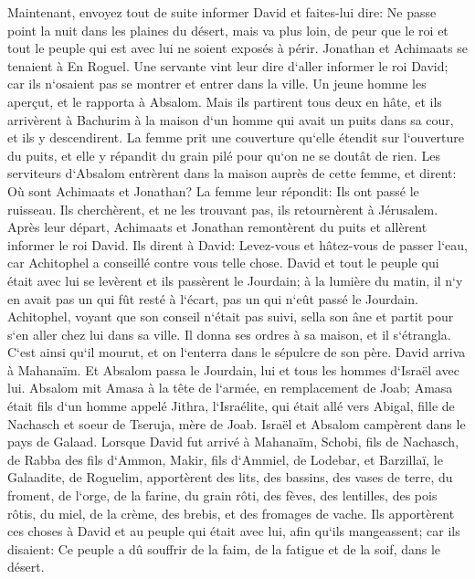 \verse Maintenant, envoyez tout de suite informer David et faites-lui dire: Ne passe point la nuit dans les plaines du désert, mais va plus loin, de peur que le roi et tout le peuple qui est avec lui ne soient exposés à périr. 
\verse Jonathan et Achimaats se tenaient à En Roguel. Une servante vint leur dire d`aller informer le roi David; car ils n`osaient pas se montrer et entrer dans la ville. 
\verse Un jeune homme les aperçut, et le rapporta à Absalom. Mais ils partirent tous deux en hâte, et ils arrivèrent à Bachurim à la maison d`un homme qui avait un puits dans sa cour, et ils y descendirent. 
\verse La femme prit une couverture qu`elle étendit sur l`ouverture du puits, et elle y répandit du grain pilé pour qu`on ne se doutât de rien. 
\verse Les serviteurs d`Absalom entrèrent dans la maison auprès de cette femme, et dirent: Où sont Achimaats et Jonathan? La femme leur répondit: Ils ont passé le ruisseau. Ils cherchèrent, et ne les trouvant pas, ils retournèrent à Jérusalem. 
\verse Après leur départ, Achimaats et Jonathan remontèrent du puits et allèrent informer le roi David. Ils dirent à David: Levez-vous et hâtez-vous de passer l`eau, car Achitophel a conseillé contre vous telle chose. 
\verse David et tout le peuple qui était avec lui se levèrent et ils passèrent le Jourdain; à la lumière du matin, il n`y en avait pas un qui fût resté à l`écart, pas un qui n`eût passé le Jourdain. 
\verse Achitophel, voyant que son conseil n`était pas suivi, sella son âne et partit pour s`en aller chez lui dans sa ville. Il donna ses ordres à sa maison, et il s`étrangla. C`est ainsi qu`il mourut, et on l`enterra dans le sépulcre de son père. 
\verse David arriva à Mahanaïm. Et Absalom passa le Jourdain, lui et tous les hommes d`Israël avec lui. 
\verse Absalom mit Amasa à la tête de l`armée, en remplacement de Joab; Amasa était fils d`un homme appelé Jithra, l`Israélite, qui était allé vers Abigal, fille de Nachasch et soeur de Tseruja, mère de Joab. 
\verse Israël et Absalom campèrent dans le pays de Galaad. 
\verse Lorsque David fut arrivé à Mahanaïm, Schobi, fils de Nachasch, de Rabba des fils d`Ammon, Makir, fils d`Ammiel, de Lodebar, et Barzillaï, le Galaadite, de Roguelim, 
\verse apportèrent des lits, des bassins, des vases de terre, du froment, de l`orge, de la farine, du grain rôti, des fèves, des lentilles, des pois rôtis, 
\verse du miel, de la crème, des brebis, et des fromages de vache. Ils apportèrent ces choses à David et au peuple qui était avec lui, afin qu`ils mangeassent; car ils disaient: Ce peuple a dû souffrir de la faim, de la fatigue et de la soif, dans le désert. 

